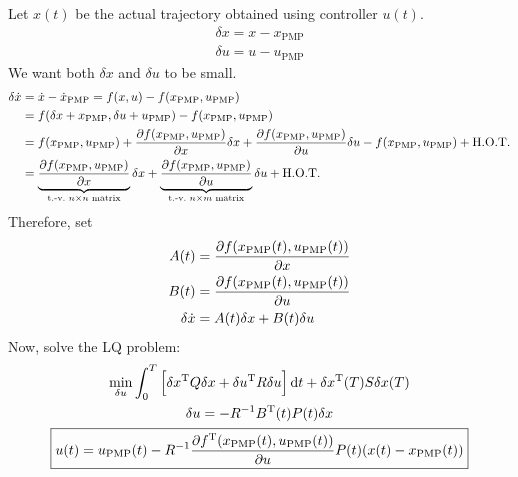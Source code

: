 \begin{center}
\end{center}
Let $x(t)$ be the actual trajectory obtained using controller $u(t)$.
\begin{gather}
  \delta x = x-x_{\text{PMP}} \\
  \delta u = u-u_{\text{PMP}}
\end{gather}
We want both $\delta x$ and $\delta u$ to be small.
\begin{align}
  \delta\dot x &= \dot x - \dot x_{\text{PMP}} = f(x,u) - f(x_{\text{PMP}},u_{\text{PMP}}) \\
               &= f(\delta x+x_{\text{PMP}},\delta u+u_{\text{PMP}}) - f(x_{\text{PMP}},u_{\text{PMP}}) \\
               &= f(x_{\text{PMP}},u_{\text{PMP}}) + \frac{\partial f(x_{\text{PMP}},u_{\text{PMP}})}{\partial x}\delta x + \frac{\partial f(x_{\text{PMP}},u_{\text{PMP}})}{\partial u} \delta u - f(x_{\text{PMP}},u_{\text{PMP}}) + \text{H.O.T.} \\
               &= \underbrace{\frac{\partial f(x_{\text{PMP}},u_{\text{PMP}})}{\partial x}}_{\text{t.-v.\ } n\times n \text{ matrix}} \delta x + \underbrace{\frac{\partial f(x_{\text{PMP}},u_{\text{PMP}})}{\partial u}}_{\text{t.-v.\ } n\times m \text{ matrix}} \delta u + \text{H.O.T.} \\
\end{align}
Therefore, set
\begin{align}
  A(t) &= \frac{\partial f(x_{\text{PMP}}(t),u_{\text{PMP}}(t))}{\partial x} \\
  B(t) &= \frac{\partial f(x_{\text{PMP}}(t),u_{\text{PMP}}(t))}{\partial u} \\
  \delta\dot x &= A(t)\delta x + B(t)\delta u
\end{align}
Now, solve the LQ problem:
\begin{gather}
  \min_{\delta u} \int_0^T \Big[ \delta x^\text{T} Q \delta x + \delta u^\text{T} R\delta u \Big] \mathop{}\!\mathrm{d} t + \delta x^\text{T}(T) S\delta x(T) \\
  \delta u = -R^{-1} B^\text{T}(t) P(t) \delta x \\
  \boxed{ u(t) = u_{\text{PMP}}(t) - R^{-1} \frac{\partial f^\text{T}(x_{\text{PMP}}(t),u_{\text{PMP}}(t))}{\partial u} P(t) (x(t)-x_{\text{PMP}}(t)) }
\end{gather}

